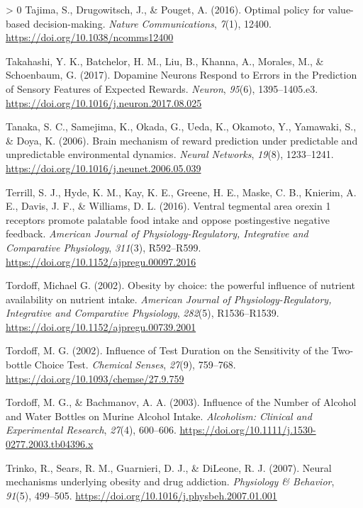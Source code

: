 \documentclass[
]{/home/nicoluarte/Downloads/templates/PNAS-template-main.tex}
\newlength{\cslhangindent}
\newenvironment{CSLReferences}[3] %
 {%
  \setlength{\parindent}{0pt}
  \ifodd #1 \everypar{\setlength{\hangindent}{\cslhangindent}}\ignorespaces\fi
  \ifnum #2 > 0
  \setlength{\parskip}{#2\baselineskip}
  \fi
 }%
 {}
\begin{document}
\begin{CSLReferences}{1}{0}
\leavevmode\hypertarget{ref-2V3MQIX5}{}%
Tajima, S., Drugowitsch, J., \& Pouget, A. (2016). Optimal policy for
value-based decision-making. \emph{Nature Communications}, \emph{7}(1),
12400. \url{https://doi.org/10.1038/ncomms12400}

\leavevmode\hypertarget{ref-698KWSAL}{}%
Takahashi, Y. K., Batchelor, H. M., Liu, B., Khanna, A., Morales, M., \&
Schoenbaum, G. (2017). Dopamine Neurons Respond to Errors in the
Prediction of Sensory Features of Expected Rewards. \emph{Neuron},
\emph{95}(6), 1395--1405.e3.
\url{https://doi.org/10.1016/j.neuron.2017.08.025}

\leavevmode\hypertarget{ref-G5PZHPCI}{}%
Tanaka, S. C., Samejima, K., Okada, G., Ueda, K., Okamoto, Y., Yamawaki,
S., \& Doya, K. (2006). Brain mechanism of reward prediction under
predictable and unpredictable environmental dynamics. \emph{Neural
Networks}, \emph{19}(8), 1233--1241.
\url{https://doi.org/10.1016/j.neunet.2006.05.039}

\leavevmode\hypertarget{ref-TESJ97B4}{}%
Terrill, S. J., Hyde, K. M., Kay, K. E., Greene, H. E., Maske, C. B.,
Knierim, A. E., Davis, J. F., \& Williams, D. L. (2016). Ventral
tegmental area orexin 1 receptors promote palatable food intake and
oppose postingestive negative feedback. \emph{American Journal of
Physiology-Regulatory, Integrative and Comparative Physiology},
\emph{311}(3), R592--R599.
\url{https://doi.org/10.1152/ajpregu.00097.2016}

\leavevmode\hypertarget{ref-YD49TU6B}{}%
Tordoff, Michael G. (2002). Obesity by choice: the powerful influence of
nutrient availability on nutrient intake. \emph{American Journal of
Physiology-Regulatory, Integrative and Comparative Physiology},
\emph{282}(5), R1536--R1539.
\url{https://doi.org/10.1152/ajpregu.00739.2001}

\leavevmode\hypertarget{ref-GNAHDKCL}{}%
Tordoff, M. G. (2002). Influence of Test Duration on the Sensitivity of
the Two-bottle Choice Test. \emph{Chemical Senses}, \emph{27}(9),
759--768. \url{https://doi.org/10.1093/chemse/27.9.759}

\leavevmode\hypertarget{ref-LJ86XJYH}{}%
Tordoff, M. G., \& Bachmanov, A. A. (2003). Influence of the Number of
Alcohol and Water Bottles on Murine Alcohol Intake. \emph{Alcoholism:
Clinical and Experimental Research}, \emph{27}(4), 600--606.
\url{https://doi.org/10.1111/j.1530-0277.2003.tb04396.x}

\leavevmode\hypertarget{ref-AAD8FGG7}{}%
Trinko, R., Sears, R. M., Guarnieri, D. J., \& DiLeone, R. J. (2007).
Neural mechanisms underlying obesity and drug addiction.
\emph{Physiology \& Behavior}, \emph{91}(5), 499--505.
\url{https://doi.org/10.1016/j.physbeh.2007.01.001}


\end{CSLReferences}
\end{document}
